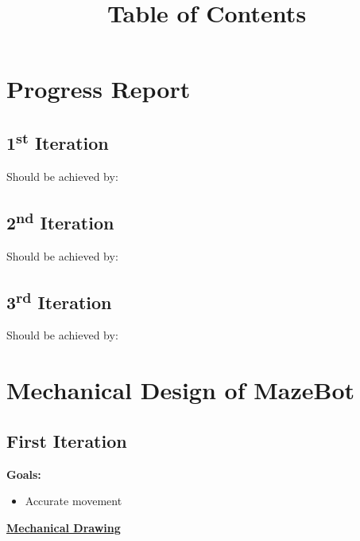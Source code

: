 \documentclass[11pt]{article}
\date{}
\title{Table of Contents}
\newcommand{\ts}{\textsuperscript}
\begin{document}



\maketitle

\tableofcontents

\newpage


\section{Progress Report}
\subsection{1\ts{st} Iteration}

Should be achieved by:
\subsection{2\ts{nd} Iteration}

Should be achieved by:
\subsection{3\ts{rd} Iteration}

Should be achieved by:



\newpage
\section{Mechanical Design of MazeBot}

\subsection{First Iteration}
\textbf{Goals:}
\begin{itemize}
\item Accurate movement
\end{itemize}
\underline{\textbf{Mechanical Drawing}}\\
\end{document}
